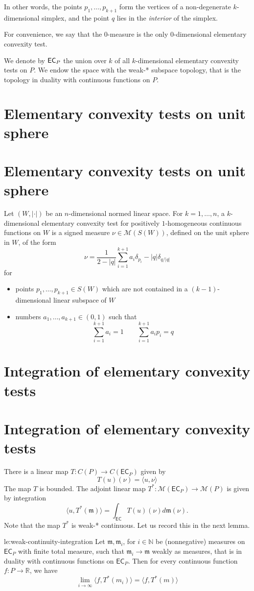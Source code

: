 \documentclass[12pt]{amsart}
\let\Section=\section
\renewcommand{\section}[2][empty]{%
  \xdef\SubsectionName{}%
  \ifthenelse{\equal{#1}{empty}}%
               {\xdef\SectionName{#2}%
                \Section{#2}}%
               {\xdef\SectionName{#1}%
                \Section[#1]{#2}}%
}
\begin{document}
In other words, the points $p_1, \dots, p_{k+1}$ form the vertices of a non-degenerate $k$-dimensional simplex, and the point $q$ lies in the \emph{interior} of the simplex. 

For convenience, we say that the $0$-measure is the only $0$-dimensional elementary convexity test.

We denote by $\mathsf{EC}_P$ the union over $k$ of all $k$-dimensional elementary convexity tests on $P$. We endow the space with the weak-* subspace topology, that is the topology in duality with continuous functions on $P$.

\section{Elementary convexity tests on unit sphere}

Let $(W, |\cdot|)$ be an $n$-dimensional normed linear space.
For $k=1, \dots, n$, a $k$-dimensional elementary convexity test for positively $1$-homogeneous continuous functions on $W$ is a signed measure $\nu\in \mathcal{M}(S(W))$, defined on the unit sphere in $W$, of the form
\[
\nu = \frac{1}{2 - |q|} \sum_{i=1}^{k+1} a_i \delta_{p_i} - |q| \delta_{q/|q|}
\]
for 
\begin{itemize}
\item points $p_1, \dots, p_{k+1} \in S(W)$ which are not contained in a $(k-1)$-dimensional linear subspace of $W$
\item numbers $a_1, \dots, a_{k+1} \in (0,1)$ such that
\[
\sum_{i=1}^{k+1} a_i = 1 \qquad \sum_{i=1}^{k+1} a_i p_i = q
\]
\end{itemize}

\section{Integration of elementary convexity tests}

There is a linear map $T: C(P) \to C(\mathsf{EC}_P)$ given by
\[
T(u)(\nu) = \langle u, \nu \rangle
\]
The map $T$ is bounded.
The adjoint linear map $T^*:\mathcal{M}(\mathsf{EC}_P) \to \mathcal{M}(P)$ is given by integration
\[
\langle u, T^*(\mathfrak{m}) \rangle = \int_{\mathsf{EC}} T(u)(\nu) d \mathfrak{m}(\nu).
\]
Note that the map $T^*$ is weak-* continuous. Let us record this in the next lemma.

\begin{lemma}{le:weak-continuity-integration}
Let $\mathfrak{m}, \mathfrak{m}_i$, for $i \in \mathbb{N}$ be (nonnegative) measures on $\mathsf{EC}_P$ with finite total measure, such that $\mathfrak{m}_i \to \mathfrak{m}$ weakly as measures, that is in duality with continuous functions on $\mathsf{EC}_P$. Then for every continuous function $f:P\to \mathbb{R}$, we have
\[
\lim_{i \to \infty} \langle f, T^*(m_i) \rangle = \langle f, T^*(m) \rangle
\]
\end{lemma}
\end{document}
